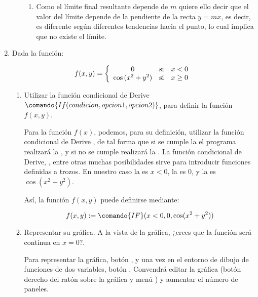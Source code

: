 \begin{enumerate}[leftmargin=*]
\begin{enumerate}
\begin{indicacion}
{\begin{enumerate}
\item Como el límite final resultante depende de $m$ quiere ello
decir que el valor del límite depende de la pendiente de la recta
$y=mx$, es decir, es diferente según diferentes tendencias hacia
el punto, lo cual implica que no existe el límite.

\end{enumerate}

}
\end{indicacion}


\end{enumerate}

\item Dada la función:

\[
f(x,y) = \left\{ {\begin{array}{*{20}c}
   0 & {\text{si}} & {x <0}  \\
   \cos{(x^2+y^2)}& {\text{si}} & {x\geq 0}  \\

 \end{array} } \right.
\]

\begin{enumerate}
  \item Utilizar la función condicional de Derive $\comando{If(condicion,opcion 1,opcion 2)}$,
   para definir la función $f(x,y)$.


\begin{indicacion}
{Para la función $f(x)$, podemos, para su definición, utilizar la
función condicional de Derive , de tal forma que si se cumple la  el
programa realizará la , y si no se cumple
realizará la . La función condicional de Derive,
, entre otras muchas posibilidades sirve para introducir
funciones definidas a trozos. En nuestro caso la 
es $x<0$, la  es $0$, y la  es
$\cos(x^2+y^2)$.

Así, la función $f(x,y)$ puede definirse mediante:

\[
f(x,y):=\comando{IF}(x<0,0,\cos(x^2+y^2))
\]

}
\end{indicacion}


  \item Representar su gráfica. A la vista de la gráfica, ¿crees
  que la función será continua en $x=0$?.


\begin{indicacion}
{Para representar la gráfica, botón , y una vez en
el entorno de dibujo de funciones de dos variables, botón
. Convendrá editar la gráfica (botón derecho del
ratón sobre la gráfica y menú ) y aumentar el número de
paneles. }
\end{indicacion}



\end{enumerate}
\end{enumerate}
